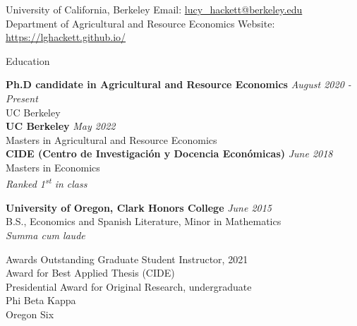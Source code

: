 \documentclass{resume} %
\begin{document}
\begin{rSection}{}
University of California, Berkeley \hfill Email:  \href{mailto:lucy\_hackett@berkeley.edu}{lucy\_hackett@berkeley.edu}\\
Department of Agricultural and Resource Economics \hfill Website:  \href{https://lghackett.github.io/}{https://lghackett.github.io/}\\
\end{rSection}


\begin{rSection}{Education}

{\bf Ph.D candidate in Agricultural and Resource Economics} \hfill {\em August 2020 - Present} 
\\ UC Berkeley\hfill \\

{\bf UC Berkeley} \hfill {\em May 2022} 
\\ Masters in Agricultural and Resource Economics\hfill\\

{\bf CIDE (Centro de Investigación y Docencia Económicas)} \hfill {\em June 2018} 
\\ Masters in Economics\hfill\\
\textit{Ranked 1\textsuperscript{st} in class}
\vspace{0.1cm}

{\bf University of Oregon, Clark Honors College} \hfill {\em June 2015} 
\\ B.S., Economics and Spanish Literature, Minor in Mathematics  \hfill\\
\textit{Summa cum laude}
\end{rSection}


\begin{rSection}{Awards} \itemsep -2pt
Outstanding Graduate Student Instructor, 2021 \\
Award for Best Applied Thesis (CIDE)\\
Presidential Award for Original Research, undergraduate \\
Phi Beta Kappa\\
Oregon Six
\end{rSection}
\end{document}
